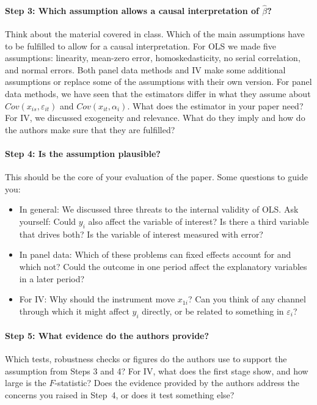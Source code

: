 \documentclass[12pt,a4paper]{article}
\begin{document}
\paragraph{Step 3: Which assumption allows a causal interpretation of $\hat{\beta}$?}
Think about the material covered in class. Which of the main assumptions have to be fulfilled to allow for a causal interpretation. For OLS we made five assumptions: linearity, mean-zero error, homoskedasticity, no serial correlation, and normal errors. Both panel data methods and IV make some additional assumptions or replace some of the assumptions with their own version. For panel data methods, we have seen that the estimators differ in what they assume about $Cov(x_{is}, \varepsilon_{it})$ and $Cov(x_{it}, \alpha_i)$. What does the estimator in your paper need? For IV, we discussed exogeneity and relevance. What do they imply and how do the authors make sure that they are fulfilled? 
 
\paragraph{Step 4: Is the assumption plausible?}
This should be the core of your evaluation of the paper. Some questions to guide you:
\begin{itemize}[leftmargin=*, itemsep=2pt]
  \item In general: We discussed three threats to the internal validity of OLS. Ask yourself: Could $y_i$ also affect the variable of interest? Is there a third variable that drives both? Is the variable of interest measured with error?
  \item In panel data: Which of these problems can fixed effects account for and which not? Could the outcome in one  period affect the explanatory variables in a later period?
  \item For IV: Why should the instrument move $x_{1i}$? Can you think of any channel through which it might affect $y_i$ directly, or be related to something in $\varepsilon_i$?
\end{itemize}
 
\paragraph{Step 5: What evidence do the authors provide?}
Which tests, robustness checks or figures do the authors use to support the assumption from Steps 3 and 4? For IV, what does the first stage show, and how large is the $F$-statistic? Does the evidence provided by the authors address the concerns you raised in Step~4, or does it test something else?
 
\end{document}

